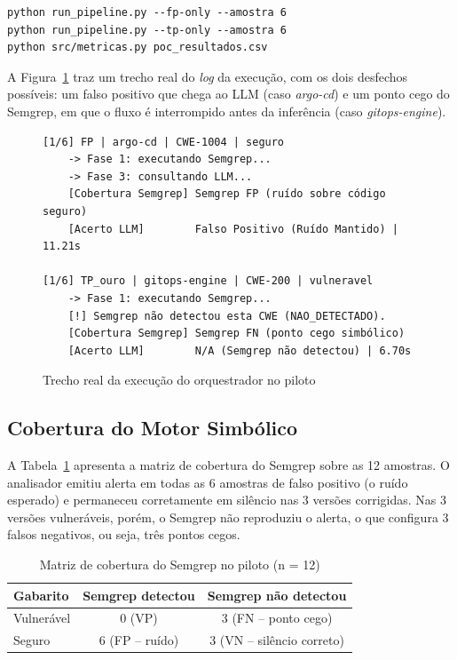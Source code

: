 \begin{verbatim}
python run_pipeline.py --fp-only --amostra 6
python run_pipeline.py --tp-only --amostra 6
python src/metricas.py poc_resultados.csv
\end{verbatim}

A Figura~\ref{fig:execucao} traz um trecho real do \textit{log} da execução, com os dois desfechos possíveis: um falso positivo que chega ao LLM (caso \textit{argo-cd}) e um ponto cego do Semgrep, em que o fluxo é interrompido antes da inferência (caso \textit{gitops-engine}).

\begin{figure}[htpb]
    \centering
    \caption{Trecho real da execução do orquestrador no piloto}
    \label{fig:execucao}
\begin{verbatim}
[1/6] FP | argo-cd | CWE-1004 | seguro
    -> Fase 1: executando Semgrep...
    -> Fase 3: consultando LLM...
    [Cobertura Semgrep] Semgrep FP (ruído sobre código seguro)
    [Acerto LLM]        Falso Positivo (Ruído Mantido) | 11.21s

[1/6] TP_ouro | gitops-engine | CWE-200 | vulneravel
    -> Fase 1: executando Semgrep...
    [!] Semgrep não detectou esta CWE (NAO_DETECTADO).
    [Cobertura Semgrep] Semgrep FN (ponto cego simbólico)
    [Acerto LLM]        N/A (Semgrep não detectou) | 6.70s
\end{verbatim}
    \fontepesquisa
\end{figure}

\subsection{Cobertura do Motor Simbólico}

A Tabela~\ref{tab:poc-cobertura} apresenta a matriz de cobertura do Semgrep sobre as 12 amostras. O analisador emitiu alerta em todas as 6 amostras de falso positivo (o ruído esperado) e permaneceu corretamente em silêncio nas 3 versões corrigidas. Nas 3 versões vulneráveis, porém, o Semgrep não reproduziu o alerta, o que configura 3 falsos negativos, ou seja, três pontos cegos.

\begin{table}[htpb]
    \centering
    \caption{Matriz de cobertura do Semgrep no piloto (n = 12)}
    \label{tab:poc-cobertura}
    \begin{tabular}{|l|c|c|}
        \hline
        \textbf{Gabarito} & \textbf{Semgrep detectou} & \textbf{Semgrep não detectou} \\
        \hline
        Vulnerável & 0 (VP) & 3 (FN -- ponto cego) \\
        \hline
        Seguro & 6 (FP -- ruído) & 3 (VN -- silêncio correto) \\
        \hline
    \end{tabular}
    \fontepesquisa
\end{table}

